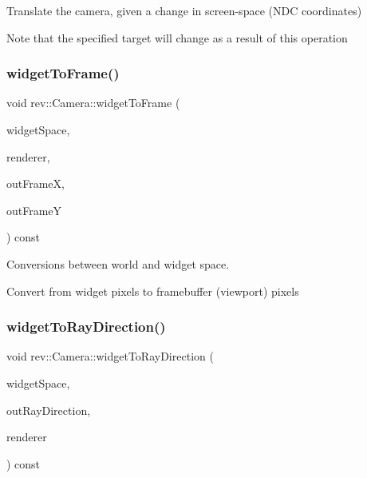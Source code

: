 Translate the camera, given a change in screen-\/space (N\+DC coordinates) 

Note that the specified target will change as a result of this operation \mbox{\label{classrev_1_1_camera_a8d45a221dc8e228d52e6787b3f6e99eb}} 
\subsubsection{\texorpdfstring{widgetToFrame()}{widgetToFrame()}}
{\footnotesize\ttfamily void rev\+::\+Camera\+::widget\+To\+Frame (\begin{DoxyParamCaption}\item[{const \mbox{\hyperlink{classrev_1_1_vector}{Vector2}} \&}]{widget\+Space,  }\item[{const \mbox{\hyperlink{classrev_1_1_main_renderer}{Main\+Renderer}} \&}]{renderer,  }\item[{real\+\_\+g \&}]{out\+FrameX,  }\item[{real\+\_\+g \&}]{out\+FrameY }\end{DoxyParamCaption}) const}



Conversions between world and widget space. 

Convert from widget pixels to framebuffer (viewport) pixels \mbox{\label{classrev_1_1_camera_a202e8948c33bbba3a1d63d26f06a7b4b}} 
\subsubsection{\texorpdfstring{widgetToRayDirection()}{widgetToRayDirection()}}
{\footnotesize\ttfamily void rev\+::\+Camera\+::widget\+To\+Ray\+Direction (\begin{DoxyParamCaption}\item[{const \mbox{\hyperlink{classrev_1_1_vector}{Vector2}} \&}]{widget\+Space,  }\item[{\mbox{\hyperlink{classrev_1_1_vector}{Vector3}} \&}]{out\+Ray\+Direction,  }\item[{const \mbox{\hyperlink{classrev_1_1_main_renderer}{Main\+Renderer}} \&}]{renderer }\end{DoxyParamCaption}) const}



